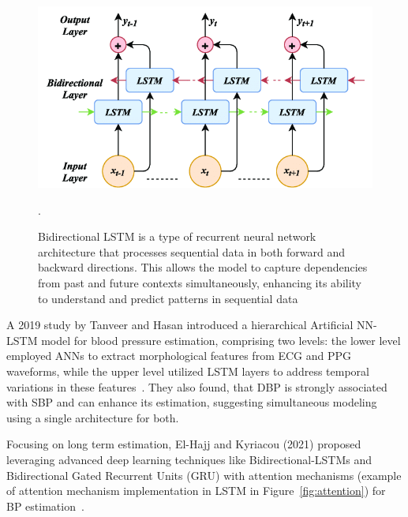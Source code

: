 \begin{figure}[h]
    \centering
    \includegraphics[scale=0.5]{images/ml/lstm}
    \caption{\small Bidirectional LSTM is a type of recurrent neural network architecture that processes sequential data in both forward and backward directions. This allows the model to capture dependencies from past and future contexts simultaneously, enhancing its ability to understand and predict patterns in sequential data~\cite{anishnamaUnderstandingBidirectionalLSTM2023}}.
    \label{fig:lstm}
\end{figure}

A 2019 study by Tanveer and Hasan introduced a hierarchical Artificial NN-LSTM model for blood pressure estimation, comprising two levels: the lower level employed ANNs to extract morphological features from ECG and PPG waveforms, while the upper level utilized LSTM layers to address temporal variations in these features~\cite{tanveerCufflessBloodPressure2019}.
They also found, that DBP is strongly associated with SBP and can enhance its estimation, suggesting simultaneous modeling using a single architecture for both.

Focusing on long term estimation, El-Hajj and Kyriacou (2021) proposed leveraging advanced deep learning techniques like Bidirectional-LSTMs and Bidirectional Gated Recurrent Units (GRU) with attention mechanisms (example of attention mechanism implementation in LSTM in Figure~\ref{fig:attention}) for BP estimation~\cite{el-hajjDeepLearningModels2021}.

